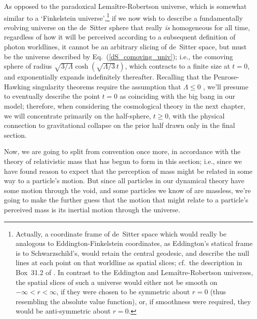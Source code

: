 As opposed to the paradoxical Lema\^{i}tre-Robertson universe, which is somewhat similar to a `Finkelstein universe',\footnote{Actually, a coordinate frame of de~Sitter space which would really be analogous to Eddington-Finkelstein coordinates, as Eddington's statical frame is to Schwarzschild's, would retain the central geodesic, and describe the null lines at each point on that worldline as spatial slices; cf.~the description in Box~31.2 of \cite{Misner1973}. In contrast to the Eddington and Lema\^{i}tre-Robertson universes, the spatial slices of such a universe would either not be smooth on $-\infty<r<\infty$, if they were chosen to be symmetric about $r=0$ (thus resembling the absolute value function), or, if smoothness were required, they would be anti-symmetric about $r=0$.} if we now wish to describe a fundamentally evolving universe on the de~Sitter sphere that really \textit{is} homogeneous for all time, regardless of how it will be perceived according to a subsequent definition of photon worldlines, it cannot be an arbitrary slicing of de~Sitter space, but must be the universe described by Eq.~(\ref{dS_comoving_univ}); i.e., the comoving sphere of radius $\sqrt{3/\Lambda}\cosh\left(\sqrt{\Lambda/3}\,t\right)$, which contracts to a finite size at $t=0$, and exponentially expands indefinitely thereafter. Recalling that the Penrose-Hawking singularity theorems require the assumption that $\Lambda\leq0$ \cite{Hawking1970}, we'll presume to eventually describe the point $t=0$ as coinciding with the big bang in our model; therefore, when considering the cosmological theory in the next chapter, we will concentrate primarily on the half-sphere, $t\geq0$, with the physical connection to gravitational collapse on the prior half drawn only in the final section.

Now, we are going to split from convention once more, in accordance with the theory of relativistic mass that has begun to form in this section; i.e., since we have found reason to expect that the perception of mass might be related in some way to a particle's motion. But since all particles in our dynamical theory have some motion through the void, and some particles we know of are massless, we're going to make the further guess that the motion that might relate to a particle's perceived mass is its inertial motion through the universe. 


